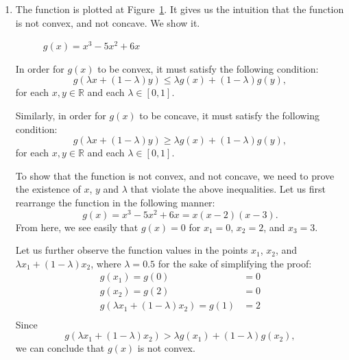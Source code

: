 \begin{enumerate}
\item The function is plotted at Figure~\ref{fig:fctg}. It gives us
the intuition that the function is not convex, and not concave. We
show it. 


  \begin{figure}[htb]
    \begin{center}
\caption{\label{fig:fctg}$g(x) = x^3 - 5x^2 + 6x$}
    \end{center}

  \end{figure}



  In order for $g(x)$ to be convex, it must satisfy the following condition:
\[g(\lambda x + (1 - \lambda)y) \leq \lambda g(x) + (1-\lambda) g(y), \] 
for each $x, y \in \mathbb{R}$ and each $\lambda \in [0,1]$.

Similarly, in order for $g(x)$ to be concave, it must satisfy the following condition:
\[g(\lambda x + (1 - \lambda)y) \geq \lambda g(x) + (1-\lambda) g(y), \] 
for each $x, y \in \mathbb{R}$ and each $\lambda \in [0,1]$.

To show that the function is not convex, and not concave, we need to
prove the existence of $x$, $y$ and $\lambda$ that violate the above
inequalities. 
 Let us first rearrange the function in the following manner:
	\[g(x) = x^3 - 5x^2 + 6x = x (x-2) (x-3). \] 
From here, we see easily that $g(x) = 0$ for $x_1 = 0$, $x_2 = 2$, and $x_3 = 3$.

Let us further observe the function values in the points $x_1$, $x_2$, and $\lambda x_1 + (1-\lambda) x_2$, where $\lambda = 0.5$ for the sake of simplifying the proof:
\begin{align*}
g(x_1) = g(0) & = 0 \\
g(x_2) = g(2) & = 0 \\
g(\lambda x_1 + (1-\lambda) x_2) = g(1) & = 2 \\
\end{align*}
Since 
\[g(\lambda x_1+ (1 - \lambda)x_2) > \lambda g(x_1) + (1-\lambda) g(x_2),\] 
we can conclude that $g(x)$ is not convex.


\end{enumerate}
